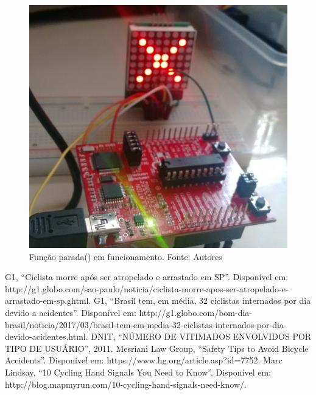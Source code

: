 \documentclass[conference]{IEEEtran}
\begin{document}
\begin{figure}[H]
  \centering
  \includegraphics[width=0.5\linewidth]{parada}
  \caption{Função parada() em funcionamento. Fonte: Autores}
  \label{fig:parada}
\end{figure}

\begin{thebibliography}{00}
   G1, ``Ciclista morre após ser atropelado e arrastado em SP''. Disponível em: http://g1.globo.com/sao-paulo/noticia/ciclista-morre-apos-ser-atropelado-e-arrastado-em-sp.ghtml.
   G1, ``Brasil tem, em média, 32 ciclistas internados por dia devido a acidentes''. Disponível em: http://g1.globo.com/bom-dia-brasil/noticia/2017/03/brasil-tem-em-media-32-ciclistas-internados-por-dia-devido-acidentes.html.
   DNIT, ``NÚMERO DE VITIMADOS ENVOLVIDOS POR TIPO DE USUÁRIO'', 2011.
   Mesriani Law Group, ``Safety Tips to Avoid Bicycle Accidents''. Disponível em: https://www.hg.org/article.asp?id=7752.
   Marc Lindsay, ``10 Cycling Hand Signals You Need to Know''. Disponível em: http://blog.mapmyrun.com/10-cycling-hand-signals-need-know/.


\end{thebibliography}
\end{document}
